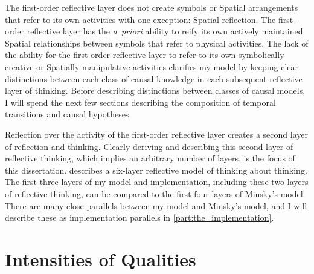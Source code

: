 The first-order reflective layer does not create symbols or Spatial
arrangements that refer to its own activities with one exception:
Spatial reflection.  The first-order reflective layer has the
\emph{a~priori} ability to reify its own actively maintained Spatial
relationships between symbols that refer to physical activities.  The
lack of the ability for the first-order reflective layer to refer to
its own symbolically creative or Spatially manipulative activities
clarifies my model by keeping clear distinctions between each class of
causal knowledge in each subsequent reflective layer of thinking.
Before describing distinctions between classes of causal models, I
will spend the next few sections describing the composition of
temporal transitions and causal hypotheses.

Reflection over the activity of the first-order reflective layer
creates a second layer of reflection and thinking.  Clearly deriving
and describing this second layer of reflective thinking, which implies
an arbitrary number of layers, is the focus of this dissertation.
\cite{minsky:2006} describes a six-layer reflective model of thinking
about thinking.  The first three layers of my model and
implementation, including these two layers of reflective thinking, can
be compared to the first four layers of Minsky's model.  There are
many close parallels between my model and Minsky's model, and I will
describe these as implementation parallels in
\autoref{part:the_implementation}.

\section{Intensities of Qualities}
\label{section:intensities_of_qualities}

